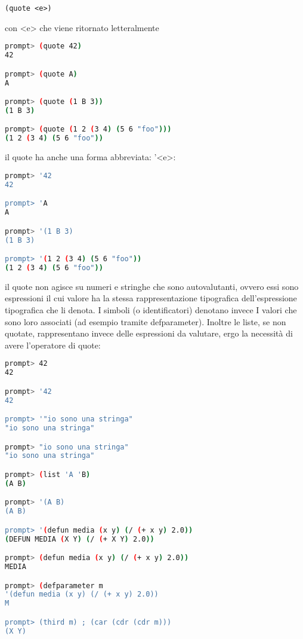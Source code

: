 \documentclass[a4paper,12pt, oneside]{book}
\begin{document}
\begin{verbatim}
(quote <e>)
\end{verbatim}
con <e> che viene ritornato letteralmente
\begin{shaded}
\begin{lstlisting}[language=bash]
prompt> (quote 42)
42

prompt> (quote A)
A

prompt> (quote (1 B 3))
(1 B 3)

prompt> (quote (1 2 (3 4) (5 6 "foo")))
(1 2 (3 4) (5 6 "foo"))
\end{lstlisting}
\end{shaded}
il quote ha anche una forma abbreviata: '<e>:
\begin{shaded}
\begin{lstlisting}[language=bash]
prompt> '42 
42

prompt> 'A
A

prompt> '(1 B 3)
(1 B 3)

prompt> '(1 2 (3 4) (5 6 "foo"))
(1 2 (3 4) (5 6 "foo"))
\end{lstlisting}
\end{shaded}
il quote non agisce su numeri e stringhe che sono autovalutanti, ovvero essi sono
espressioni il cui valore ha la stessa rappresentazione tipografica dell'espressione
tipografica che li denota. I simboli (o identificatori) denotano invece I valori che sono loro associati (ad
esempio tramite defparameter). Inoltre le liste, se non quotate, rappresentano invece delle espressioni da valutare, ergo la
necessità di avere l'operatore di quote:
\begin{shaded}
\begin{lstlisting}[language=bash]
prompt> 42
42

prompt> '42
42

prompt> '"io sono una stringa"
"io sono una stringa"

prompt> "io sono una stringa"
"io sono una stringa"

prompt> (list 'A 'B)
(A B)

prompt> '(A B)
(A B)

prompt> '(defun media (x y) (/ (+ x y) 2.0))
(DEFUN MEDIA (X Y) (/ (+ X Y) 2.0))

prompt> (defun media (x y) (/ (+ x y) 2.0))
MEDIA

prompt> (defparameter m
'(defun media (x y) (/ (+ x y) 2.0))
M

prompt> (third m) ; (car (cdr (cdr m)))
(X Y)
\end{lstlisting}
\end{shaded} 
\end{document}
